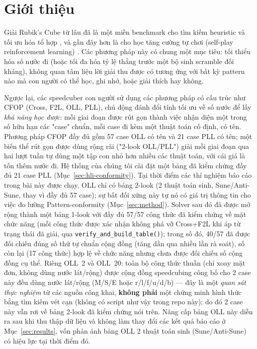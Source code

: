\documentclass[10pt,conference]{article}
\begin{document}
\section{Giới thiệu}
\label{sec:intro}

Giải Rubik's Cube từ lâu đã là một miền benchmark cho tìm kiếm
heuristic và tối ưu hóa tổ hợp \citep{korf1997,rokicki2014}, và gần đây
hơn là cho học tăng cường tự chơi (self-play reinforcement learning)
\citep{mcaleer2018}. Các phương pháp này có chung một mục tiêu: tối
thiểu hóa số nước đi (hoặc tối đa hóa tỷ lệ thắng trước một bộ sinh
scramble đối kháng), không quan tâm liệu lời giải thu được có tương ứng
với bất kỳ pattern nào mà con người có thể học, ghi nhớ, hoặc giải
thích hay không.

Ngược lại, các speedcuber con người sử dụng các phương pháp có cấu trúc
như CFOP (Cross, F2L, OLL, PLL), chủ động đánh đổi tính tối ưu về số
nước để lấy \emph{khả năng học được}: mỗi giai đoạn được rút gọn thành
việc nhận diện một trong số hữu hạn các "case" chuẩn, mỗi case đi kèm
một thuật toán cố định, có tên. Phương pháp CFOP đầy đủ gồm 57 case OLL
có tên và 21 case PLL có tên; một biến thể rút gọn được dùng rộng rãi
("2-look OLL/PLL") giải mỗi giai đoạn qua hai lượt tuần tự dùng một tập
con nhỏ hơn nhiều các thuật toán, với cái giá là tốn thêm nước đi. Hệ
thống của chúng tôi cài đặt một bảng đã kiểm chứng đầy đủ 21 case PLL
(Mục~\ref{sec:hli-conformity}). Tại thời điểm các thí nghiệm báo cáo
trong bài này được chạy, OLL chỉ có bảng 2-look (2 thuật toán sinh,
Sune/Anti-Sune, thay vì đầy đủ 57 case); sự bất đối xứng này tự nó có
giá trị thông tin cho việc đo lường Pattern-conformity
(Mục~\ref{sec:method}). Solver sau đó đã được mở rộng thành một bảng
1-look với đầy đủ 57/57 công thức đã kiểm chứng về mặt chức năng (mỗi
công thức được xác nhận không phá vỡ Cross+F2L khi áp từ trạng thái đã
giải, qua \texttt{verify\_and\_build\_table()}); trong số đó, 40/57
đã được đối chiếu đúng số thứ tự chuẩn cộng đồng (tăng dần qua nhiều
lần rà soát), số còn lại (17 công thức) hợp lệ về chức năng nhưng
chưa được đối chiếu số cộng đồng cụ thể. Riêng OLL~2 và OLL~20: toàn
bộ công thức thuần (chỉ xoay mặt đơn, không dùng nước lát/rộng) được
cộng đồng speedcubing công bố cho 2 case này đều dùng nước lát/rộng
(M/S/E hoặc r/l/f/u/d/b) --- đây là một \emph{quan sát thực nghiệm}
từ các nguồn công khai, \textbf{không phải} một chứng minh hình thức
bằng tìm kiếm vét cạn (không có script như vậy trong repo này); do đó
2 case này vẫn rơi về bảng 2-look đã kiểm chứng nói trên. Nâng cấp
bảng OLL này diễn ra sau khi thu thập dữ liệu và không làm thay đổi
các kết quả báo cáo ở Mục~\ref{sec:results}, vốn phản ánh bảng OLL 2
thuật toán sinh (Sune/Anti-Sune) có hiệu lực tại thời điểm đó.
\end{document}

